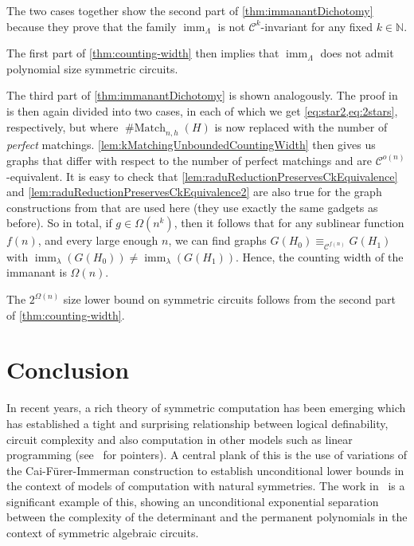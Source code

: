 \documentclass[11pt, DIV=15]{scrarticle}
\theoremstyle{definition}
\theoremstyle{plain}
\theoremstyle{remark}
\newcommand{\bbN}{\mathbb{N}}
\DeclareMathOperator{\imm}{imm}
\DeclareMathOperator{\Match}{\# Match}
\begin{document}
The two cases together show the second part of \cref{thm:immanantDichotomy} because they prove that the family $\imm_{\Lambda}$ is not $\mathcal{C}^k$-invariant for any fixed $k \in \bbN$. 
	
The first part of \cref{thm:counting-width} then implies that $\imm_{\Lambda}$ does not admit polynomial size symmetric circuits.

The third part of \cref{thm:immanantDichotomy} is shown analogously. The proof in \cite{curticapean2021complexitydichotomyimmanantfamilies} is then again divided into two cases, in each of which we get \cref{eq:star2,eq:2stars}, respectively, but where $\Match_{n,h}(H)$ is now replaced with the number of \emph{perfect} matchings. \cref{lem:kMatchingUnboundedCountingWidth} then gives us graphs that differ with respect to the number of perfect matchings and are $\mathcal{C}^{o(n)}$-equivalent. It is easy to check that \cref{lem:raduReductionPreservesCkEquivalence} and \cref{lem:raduReductionPreservesCkEquivalence2} are also true for the graph constructions from \cite{curticapean2021complexitydichotomyimmanantfamilies} that are used here (they use exactly the same gadgets as before).
So in total, if $g \in \Omega(n^k)$, then it follows that for any sublinear function $f(n)$, and every large enough $n$, we can find graphs $G(H_0) \equiv_{\mathcal{C}^{f(n)}} G(H_1)$ with $\imm_\lambda(G(H_0)) \neq \imm_\lambda(G(H_1))$. Hence, the counting width of the immanant is $\Omega(n)$.

The $2^{\Omega(n)}$ size lower bound on symmetric circuits follows from the second part of \cref{thm:counting-width}.

\section{Conclusion}
	

In recent years, a rich theory of symmetric computation has been emerging which has established a tight and surprising relationship between logical definability, circuit complexity and also computation in other models such as linear programming (see~\cite{dawar_csl2020,dawar_icalp2024} for pointers).  A central plank of this is the use of variations of the Cai-F\"urer-Immerman construction to establish unconditional lower bounds in the context of models of computation with natural symmetries.  The work in~\cite{dawar_symmetric_2020,dawar_symmetric_2025} is a significant example of this, showing an unconditional exponential separation between the complexity of the determinant and the permanent polynomials in the context of symmetric algebraic circuits.
\end{document}
